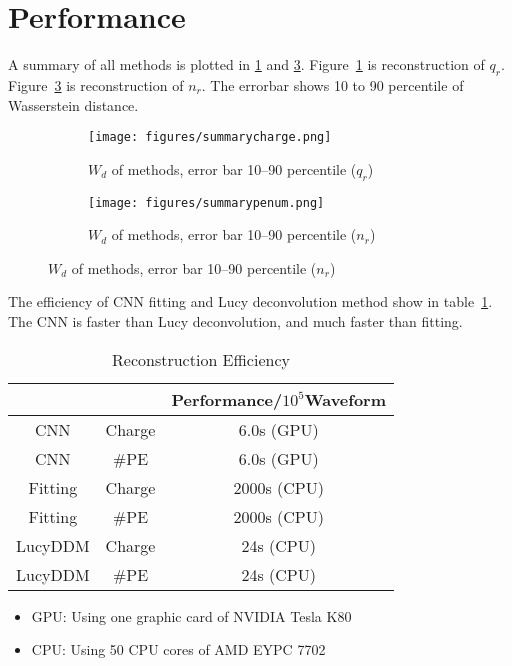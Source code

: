 \section{Performance} %
A summary of all methods is plotted in \ref{fig:chargesummary} and \ref{fig:penumsummary}. Figure~\ref{fig:chargesummary} is reconstruction of $q_{r}$. Figure~\ref{fig:penumsummary} is reconstruction of $n_{r}$. The errorbar shows 10 to 90 percentile of Wasserstein distance. 

\begin{figure}[H]
\begin{minipage}{.45\textwidth}
\begin{figure}[H]
    \centering
    \texttt{[image: figures/summarycharge.png]}
    \caption{\label{fig:chargesummary} $W_{d}$ of methods, error bar 10--90 percentile ($q_{r}$)}
\end{figure}
\end{minipage}
\hspace{1mm}
\begin{minipage}{.45\textwidth}
\begin{figure}[H]
    \centering
    \texttt{[image: figures/summarypenum.png]}
    \caption{\label{fig:penumsummary} $W_{d}$ of methods, error bar 10--90 percentile ($n_{r}$)}
\end{figure}
\end{minipage}
\end{figure}

The efficiency of CNN fitting and Lucy deconvolution method show in table~\ref{fig:efficiency}. The CNN is faster than Lucy deconvolution, and much faster than fitting. 

\begin{table}[H]
    \centering
    \caption{\label{fig:efficiency} Reconstruction Efficiency}
    \begin{tabular}{c|c|c}
        \hline
        & & Performance/$10^{5}$Waveform \\
        \hline
        CNN & Charge & 6.0s (GPU) \\
        \hline
        CNN & \#PE & 6.0s (GPU)\\
        \hline
        Fitting & Charge & 2000s (CPU) \\
        \hline
        Fitting & \#PE & 2000s (CPU) \\
        \hline
        LucyDDM & Charge & 24s (CPU) \\
        \hline
        LucyDDM & \#PE & 24s (CPU) \\
        \hline
    \end{tabular}
\end{table}
\hspace{4mm}
\begin{center}
\begin{itemize}
    \item GPU: Using one graphic card of NVIDIA Tesla K80
    \item CPU: Using 50 CPU cores of AMD EYPC 7702
\end{itemize}
\end{center}


